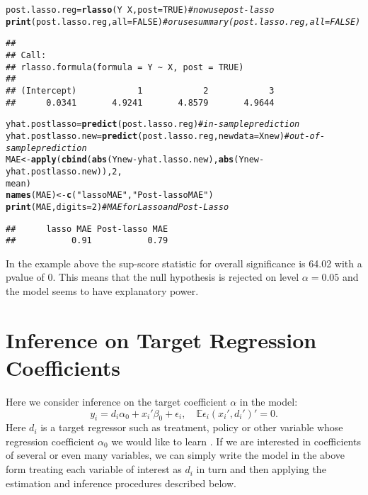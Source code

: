\documentclass{amsart}\usepackage[]{graphicx}\usepackage[]{color}
\makeatletter
\newcommand{\hlnum}[1]{\textcolor[rgb]{0.686,0.059,0.569}{#1}}%
\newcommand{\hlstr}[1]{\textcolor[rgb]{0.192,0.494,0.8}{#1}}%
\newcommand{\hlcom}[1]{\textcolor[rgb]{0.678,0.584,0.686}{\textit{#1}}}%
\newcommand{\hlopt}[1]{\textcolor[rgb]{0,0,0}{#1}}%
\newcommand{\hlstd}[1]{\textcolor[rgb]{0.345,0.345,0.345}{#1}}%
\newcommand{\hlkwb}[1]{\textcolor[rgb]{0.69,0.353,0.396}{#1}}%
\newcommand{\hlkwc}[1]{\textcolor[rgb]{0.333,0.667,0.333}{#1}}%
\newcommand{\hlkwd}[1]{\textcolor[rgb]{0.737,0.353,0.396}{\textbf{#1}}}%
\newenvironment{kframe}{%
 \def\at@end@of@kframe{}%
 \ifinner\ifhmode%
  \def\at@end@of@kframe{\end{minipage}}%
  \begin{minipage}{\columnwidth}%
 \fi\fi%
 \def\FrameCommand##1{\hskip\@totalleftmargin \hskip-\fboxsep
 \colorbox{shadecolor}{##1}\hskip-\fboxsep
     \hskip-\linewidth \hskip-\@totalleftmargin \hskip\columnwidth}%
 \MakeFramed {\advance\hsize-\width
   \@totalleftmargin\z@ \linewidth\hsize
   \@setminipage}}%
 {\par\unskip\endMakeFramed%
 \at@end@of@kframe}
\newenvironment{knitrout}{}{} %
\makeatother
\begin{document}
\begin{knitrout}
\begin{kframe}
\begin{alltt}
\hlstd{post.lasso.reg} \hlkwb{=} \hlkwd{rlasso}\hlstd{(Y} \hlopt{~} \hlstd{X,} \hlkwc{post} \hlstd{=} \hlnum{TRUE}\hlstd{)}  \hlcom{#now use post-lasso}
\hlkwd{print}\hlstd{(post.lasso.reg,} \hlkwc{all} \hlstd{=} \hlnum{FALSE}\hlstd{)}  \hlcom{# or use  summary(post.lasso.reg, all=FALSE) }
\end{alltt}
\begin{verbatim}
## 
## Call:
## rlasso.formula(formula = Y ~ X, post = TRUE)
## 
## (Intercept)            1            2            3  
##      0.0341       4.9241       4.8579       4.9644
\end{verbatim}
\begin{alltt}
\hlstd{yhat.postlasso} \hlkwb{=} \hlkwd{predict}\hlstd{(post.lasso.reg)}  \hlcom{#in-sample prediction}
\hlstd{yhat.postlasso.new} \hlkwb{=} \hlkwd{predict}\hlstd{(post.lasso.reg,} \hlkwc{newdata} \hlstd{= Xnew)}  \hlcom{#out-of-sample prediction}
\hlstd{MAE} \hlkwb{<-} \hlkwd{apply}\hlstd{(}\hlkwd{cbind}\hlstd{(}\hlkwd{abs}\hlstd{(Ynew} \hlopt{-} \hlstd{yhat.lasso.new),} \hlkwd{abs}\hlstd{(Ynew} \hlopt{-} \hlstd{yhat.postlasso.new)),} \hlnum{2}\hlstd{,}
    \hlstd{mean)}
\hlkwd{names}\hlstd{(MAE)} \hlkwb{<-} \hlkwd{c}\hlstd{(}\hlstr{"lasso MAE"}\hlstd{,} \hlstr{"Post-lasso MAE"}\hlstd{)}
\hlkwd{print}\hlstd{(MAE,} \hlkwc{digits} \hlstd{=} \hlnum{2}\hlstd{)}  \hlcom{# MAE for Lasso and Post-Lasso}
\end{alltt}
\begin{verbatim}
##      lasso MAE Post-lasso MAE 
##           0.91           0.79
\end{verbatim}
\end{kframe}
\end{knitrout}

In the example above the sup-score statistic for overall significance is 64.02 with a pvalue of 0. This means that the null hypothesis is rejected on level $\alpha=0.05$ and the model seems to have explanatory power.

\section{Inference on Target Regression Coefficients}

Here we consider inference on the target coefficient $\alpha$ in the model:
$$
y_i = d_i \alpha_0 + x_i'\beta_0 + \epsilon_i,   \quad \mathbb{E} \epsilon_i (x_i', d_i')' =0.
$$
Here $d_i$ is a target regressor such as treatment, policy or other variable whose regression coefficient $\alpha_0$ we would like to learn \citep{BelloniChernozhukovHansen2011}.  If we are interested in coefficients of several or even many variables, we can simply  write the model in the above form treating each variable of interest as $d_i$ in turn and then applying the estimation and inference procedures described below.
\end{document}
